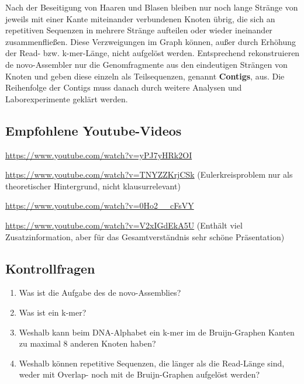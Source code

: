 Nach der Beseitigung von Haaren und Blasen bleiben nur noch lange Stränge von jeweils mit einer Kante miteinander verbundenen Knoten übrig, die sich an repetitiven Sequenzen in mehrere Stränge aufteilen oder wieder ineinander zusammenfließen. Diese Verzweigungen im Graph können, außer durch Erhöhung der Read- bzw. k-mer-Länge, nicht aufgelöst werden. Entsprechend rekonstruieren de novo-Assembler nur die Genomfragmente aus den eindeutigen Strängen von Knoten und geben diese einzeln als Teilsequenzen, genannt \textbf{Contigs}, aus. Die Reihenfolge der Contigs muss danach durch weitere Analysen und Laborexperimente geklärt werden. 

\subsection{Empfohlene Youtube-Videos}
\begin{description}[align=left]
	\item [Overlap-Graph] \href{https://www.youtube.com/watch?v=yPJ7yHRk2OI}{https://www.youtube.com/watch?v=yPJ7yHRk2OI}
	\item [De-Bruijn-Graph] \href{https://www.youtube.com/watch?v=TNYZZKrjCSk}{https://www.youtube.com/watch?v=TNYZZKrjCSk} (Eulerkreisproblem nur als theoretischer Hintergrund, nicht klausurrelevant)
	\item [Contigs] \href{https://www.youtube.com/watch?v=0Ho2\_\_cFsVY}{https://www.youtube.com/watch?v=0Ho2\_\_cFsVY}
	\item [Gesamtüberblick de novo-Assemblierung] \href{https://www.youtube.com/watch?v=V2xIGdEkA5U}{https://www.youtube.com/watch?v=V2xIGdEkA5U} (Enthält viel Zusatzinformation, aber für das Gesamtverständnis sehr schöne Präsentation)
\end{description}

\subsection{Kontrollfragen}
\begin{enumerate}
	\item Was ist die Aufgabe des de novo-Assemblies?
	\item Was ist ein k-mer?
	\item Weshalb kann beim DNA-Alphabet ein k-mer im de Bruijn-Graphen Kanten zu maximal 8 anderen Knoten haben?
	\item Weshalb können repetitive Sequenzen, die länger als die Read-Länge sind, weder mit Overlap- noch mit de Bruijn-Graphen aufgelöst werden?
\end{enumerate}
